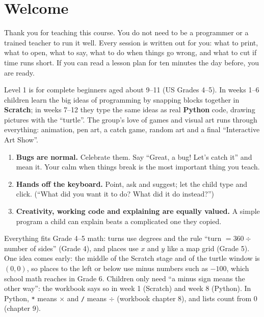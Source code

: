 \documentclass[level=1,teacher]{kidscode}
\begin{document}
\tableofcontents

\section{Welcome}
Thank you for teaching this course. You do not need to be a programmer or a trained teacher to run it
well. Every session is written out for you: what to print, what to open, what to say, what to do when
things go wrong, and what to cut if time runs short. If you can read a lesson plan for ten minutes the
day before, you are ready.

Level 1 is for complete beginners aged about 9--11 (US Grades 4--5). In weeks 1--6 children learn the big ideas of
programming by snapping blocks together in \textbf{Scratch}; in weeks 7--12 they type the same ideas as
real \textbf{Python} code, drawing pictures with the \enquote{turtle}. The group's love of games and
visual art runs through everything: animation, pen art, a catch game, random art and a final
\enquote{Interactive Art Show}.

\begin{teachernote}
\begin{enumerate}[itemsep=2pt]
  \item \textbf{Bugs are normal.} Celebrate them. Say \enquote{Great, a bug! Let's catch it} and mean it.
        Your calm when things break is the most important thing you teach.
  \item \textbf{Hands off the keyboard.} Point, ask and suggest; let the child type and click.
        (\enquote{What did you want it to do? What did it do instead?})
  \item \textbf{Creativity, working code and explaining are equally valued.} A simple program a child
        can explain beats a complicated one they copied.
\end{enumerate}
\end{teachernote}

\begin{teachernote}
Everything fits Grade 4--5 math: turns use degrees and the rule \enquote{turn $= 360 \div$ number of sides}
(Grade 4), and places use $x$ and $y$ like a map grid (Grade 5). One idea comes early: the middle of the
Scratch stage and of the turtle window is $(0, 0)$, so places to the left or below use minus numbers such as
$-100$, which school math reaches in Grade 6. Children only need \enquote{a minus sign means the other way}:
the workbook says so in week 1 (Scratch) and week 8 (Python). In Python, \texttt{*} means $\times$ and
\texttt{/} means $\div$ (workbook chapter 8), and lists count from 0 (chapter 9).
\end{teachernote}
\end{document}
